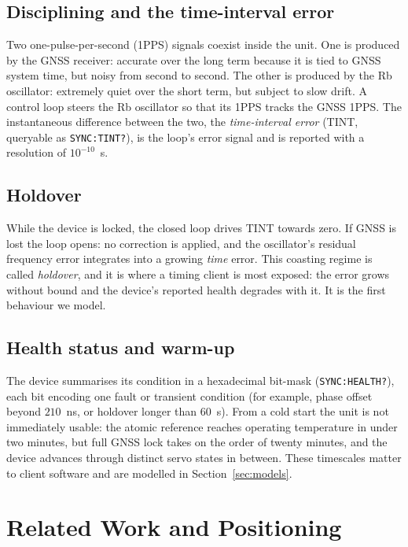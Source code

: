 \documentclass[conference]{IEEEtran}
\begin{document}
\subsection{Disciplining and the time-interval error}
Two one-pulse-per-second (1PPS) signals coexist inside the unit. One is
produced by the GNSS receiver: accurate over the long term because it
is tied to GNSS system time, but noisy from second to second. The other
is produced by the Rb oscillator: extremely quiet over the short term,
but subject to slow drift. A control loop steers the Rb oscillator so
that its 1PPS tracks the GNSS 1PPS. The instantaneous difference between
the two, the \emph{time-interval error} (TINT, queryable as
\texttt{SYNC:TINT?}), is the loop's error signal and is reported with a
resolution of $10^{-10}$~s.

\subsection{Holdover}
While the device is locked, the closed loop drives TINT towards zero. If
GNSS is lost the loop opens: no correction is applied, and the
oscillator's residual frequency error integrates into a growing
\emph{time} error. This coasting regime is called \emph{holdover}, and it is where a
timing client is most exposed: the error grows without bound and the
device's reported health degrades with it. It is the first behaviour we
model.

\subsection{Health status and warm-up}
The device summarises its condition in a hexadecimal bit-mask
(\texttt{SYNC:HEALTH?}), each bit encoding one fault or transient
condition (for example, phase offset beyond $210$~ns, or holdover
longer than $60$~s). From a cold start the unit is not immediately
usable: the atomic reference reaches operating temperature in under two
minutes, but full GNSS lock takes on the order of twenty minutes, and
the device advances through distinct servo states in between. These
timescales matter to client software and are modelled in
Section~\ref{sec:models}.

\section{Related Work and Positioning}
\label{sec:related}
\end{document}
